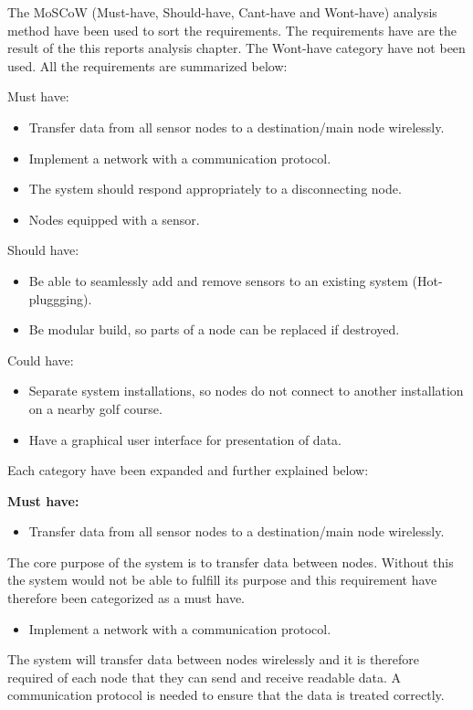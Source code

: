 The MoSCoW (Must-have, Should-have, Cant-have and Wont-have) analysis method have been used to sort the requirements. The requirements have are the result of the this reports analysis chapter. The Wont-have category have not been used. All the requirements are summarized below:


Must have:
\begin{itemize}
\item Transfer data from all sensor nodes to a destination/main node wirelessly.
\item Implement a network with a communication protocol.
\item The system should respond appropriately to a disconnecting node.
\item Nodes equipped with a sensor.
\end{itemize}

Should have:
\begin{itemize}
\item Be able to seamlessly add and remove sensors to an existing system (Hot-pluggging).
\item Be modular build, so parts of a node can be replaced if destroyed.
\end{itemize}

Could have:
\begin{itemize}
\item Separate system installations, so nodes do not connect to another installation on a nearby golf course.
\item Have a graphical user interface for presentation of data.
\end{itemize}


Each category have been expanded and further explained below:

\textbf{Must have:}
\begin{itemize}
\item Transfer data from all sensor nodes to a destination/main node wirelessly.
\end{itemize}
The core purpose of the system is to transfer data between nodes. Without this the system would not be able to fulfill its purpose and this requirement have therefore been categorized as a must have.


\begin{itemize}
\item Implement a network with a communication protocol.
\end{itemize}
The system will transfer data between nodes wirelessly and it is therefore required of each node that they can send and receive readable data. A communication protocol is needed to ensure that the data is treated correctly.



